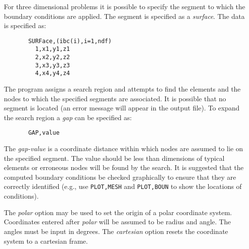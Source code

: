 For three dimensional problems it is possible to
specify the segment to which the boundary conditions
are applied.  The segment is specified as a {\it surface}.
The data is specified as:

\begin{verbatim}
       SURFace,(ibc(i),i=1,ndf)
         1,x1,y1,z1
         2,x2,y2,z2
         3,x3,y3,z3
         4,x4,y4,z4
\end{verbatim}

The program assigns a search region and attempts to
find the elements and the nodes to which the specified
segments are associated.  It is possible that no segment
is located (an error message will appear in the output file).  To
expand the search region a {\it gap} can be specified as:

\begin{verbatim}
       GAP,value
\end{verbatim}

\vspace{3mm}

\noindent
The {\it gap-value} is a coordinate distance within which
nodes are assumed to lie on the specified segment.  The
value should be less than dimensions of typical elements
or erroneous nodes will be found by the search.
It is suggested that the computed boundary conditions
be checked graphically to ensure that they are
correctly identified (e.g., use {\tt PLOT,MESH} and {\tt PLOT,BOUN}
to show the locations of conditions).

The {\it polar} option may be used to set the origin of a
polar coordinate system.  Coordinates entered after
{\it polar} will be assumed to be radius and angle. The angles must
be input in degrees. The
{\it cartesian} option resets the coordinate system to a
cartesian frame.
\vfil\eject
